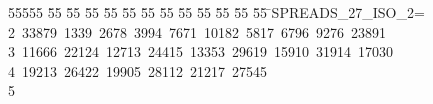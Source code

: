 %
%
\begin{tabbing}
55555 \= 55 \= 55 \= 55 \= 55 \= 55 \= 55 \= 55 \= 55 \= 55 \= 55 \= 55 \= 55 \= \>SPREADS\_27\_ISO\_2=\\[0pt]
2\ 33879\ 1339\ 2678\ 3994\ 7671\ 10182\ 5817\ 6796\ 9276\ 23891\ \\[0pt]
3\ 11666\ 22124\ 12713\ 24415\ 13353\ 29619\ 15910\ 31914\ 17030\ \\[0pt]
4\ 19213\ 26422\ 19905\ 28112\ 21217\ 27545\\[0pt]
5\>\end{tabbing}
